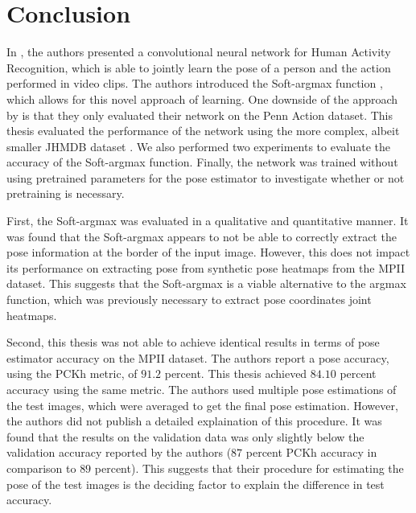 \chapter{Conclusion}
\label{sec:chapter6}
In \cite{luvizon_2d/3d_2018}, the authors presented a convolutional neural network for Human Activity Recognition, which is able to jointly learn the pose of a person and the action performed in video clips.
The authors introduced the Soft-argmax function \cite{luvizon_human_2017}, which allows for this novel approach of learning.
One downside of the approach by \cite{luvizon_2d/3d_2018} is that they only evaluated their network on the Penn Action dataset.
This thesis evaluated the performance of the network using the more complex, albeit smaller JHMDB dataset \cite{jhuang_towards_2013}.
We also performed two experiments to evaluate the accuracy of the Soft-argmax function.
Finally, the network was trained without using pretrained parameters for the pose estimator to investigate whether or not pretraining is necessary.

First, the Soft-argmax was evaluated in a qualitative and quantitative manner.
It was found that the Soft-argmax appears to not be able to correctly extract the pose information at the border of the input image.
However, this does not impact its performance on extracting pose from synthetic pose heatmaps from the MPII dataset.
This suggests that the Soft-argmax is a viable alternative to the argmax function, which was previously necessary to extract pose coordinates joint heatmaps.

Second, this thesis was not able to achieve identical results in terms of pose estimator accuracy on the MPII dataset.
The authors report a pose accuracy, using the PCKh metric, of $91.2$ percent.
This thesis achieved $84.10$ percent accuracy using the same metric.
The authors used multiple pose estimations of the test images, which were averaged to get the final pose estimation.
However, the authors did not publish a detailed explaination of this procedure.
It was found that the results on the validation data was only slightly below the validation accuracy reported by the authors ($87$ percent PCKh accuracy in comparison to $89$ percent).
This suggests that their procedure for estimating the pose of the test images is the deciding factor to explain the difference in test accuracy.

